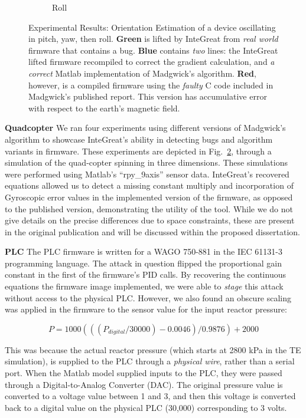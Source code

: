 \begin{figure}
\begin{subfigure}[b]{0.327\textwidth}
        \caption{Roll}
        \label{fig:roll}
    \end{subfigure}
    \hfill
    \caption{Experimental Results: Orientation Estimation of a device oscillating in pitch, yaw, then roll. \textbf{Green} is lifted by InteGreat from \emph{real world} firmware that contains a bug. \textbf{Blue} contains \emph{two} lines: the InteGreat lifted firmware recompiled to correct the gradient calculation, and \emph{a correct} Matlab implementation of Madgwick's algorithm. \textbf{Red}, however, is a compiled firmware using the \emph{faulty} C code included in Madgwick's published report. This version has accumulative error with respect to the earth's magnetic field.}
    \label{fig:madg}
\end{figure}

\textbf{Quadcopter}
We ran four experiments using different versions of Madgwick's algorithm to showcase InteGreat's ability in detecting bugs and algorithm variants in firmware.
These experiments are depicted in Fig.~\ref{fig:madg}, through a simulation of the quad-copter spinning in three dimensions.
These simulations were performed using Matlab's ``rpy\_9axis'' sensor data.
InteGreat's recovered equations allowed us to detect a missing constant multiply and incorporation of Gyroscopic error values in the implemented version of the firmware, as opposed to the published version, demonstrating the utility of the tool.
While we do not give details on the precise differences due to space constraints, these are present in the original publication and will be discussed within the proposed dissertation.

\textbf{PLC}
The PLC firmware is written for a WAGO 750-881 in the IEC 61131-3 programming language.
The attack in question flipped the proportional gain constant in the first of the firmware's PID calls.
By recovering the continuous equations the firmware image implemented, we were able to \emph{stage} this attack without access to the physical PLC.
However, we also found an obscure scaling was applied in the firmware to the sensor value for the input reactor pressure:

\begin{equation}
    P = 1000(((P_{digital} / 30000) - 0.0046) / 0.9876) + 2000
	\label{eqn:input-conv}
\end{equation}

This was because the actual reactor pressure (which starts at 2800 kPa in the TE simulation), is supplied to the PLC through a \emph{physical wire}, rather than a serial port.
When the Matlab model supplied inputs to the PLC, they were passed through a Digital-to-Analog Converter (DAC).
The original pressure value is converted to a voltage value between 1 and 3, and then this voltage is converted back to a digital value on the physical PLC (30,000) corresponding to 3 volts.

